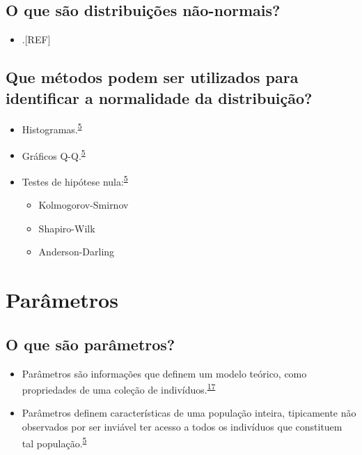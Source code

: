 \documentclass[
]{book}
\providecommand{\tightlist}{%
  \setlength{\itemsep}{0pt}\setlength{\parskip}{0pt}}
\begin{document}
\hypertarget{o-que-suxe3o-distribuiuxe7uxf5es-nuxe3o-normais}{%
\subsection{O que são distribuições não-normais?}\label{o-que-suxe3o-distribuiuxe7uxf5es-nuxe3o-normais}}

\begin{itemize}
\tightlist
\item
  .{[}REF{]}
\end{itemize}

\hypertarget{que-muxe9todos-podem-ser-utilizados-para-identificar-a-normalidade-da-distribuiuxe7uxe3o}{%
\subsection{Que métodos podem ser utilizados para identificar a normalidade da distribuição?}\label{que-muxe9todos-podem-ser-utilizados-para-identificar-a-normalidade-da-distribuiuxe7uxe3o}}

\begin{itemize}
\item
  Histogramas.\textsuperscript{\protect\hyperlink{ref-vetter2017}{5}}
\item
  Gráficos Q-Q.\textsuperscript{\protect\hyperlink{ref-vetter2017}{5}}
\item
  Testes de hipótese nula:\textsuperscript{\protect\hyperlink{ref-vetter2017}{5}}

  \begin{itemize}
  \item
    Kolmogorov-Smirnov
  \item
    Shapiro-Wilk
  \item
    Anderson-Darling
  \end{itemize}
\end{itemize}

\hypertarget{parametros}{%
\section{Parâmetros}\label{parametros}}

\hypertarget{o-que-suxe3o-paruxe2metros}{%
\subsection{O que são parâmetros?}\label{o-que-suxe3o-paruxe2metros}}

\begin{itemize}
\item
  Parâmetros são informações que definem um modelo teórico, como propriedades de uma coleção de indivíduos.\textsuperscript{\protect\hyperlink{ref-Altman1999}{17}}
\item
  Parâmetros definem características de uma população inteira, tipicamente não observados por ser inviável ter acesso a todos os indivíduos que constituem tal população.\textsuperscript{\protect\hyperlink{ref-vetter2017}{5}}
\end{itemize}
\end{document}
